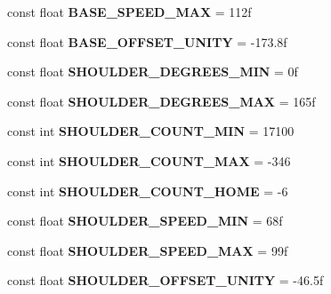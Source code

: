 \begin{DoxyCompactItemize}
const float {\bfseries B\+A\+S\+E\+\_\+\+S\+P\+E\+E\+D\+\_\+\+M\+AX} = 112f
\item 
\mbox{\label{class_scorbot_e_r_v_plus_a4389f35a8cfc607dbf6160560a141027}} 
const float {\bfseries B\+A\+S\+E\+\_\+\+O\+F\+F\+S\+E\+T\+\_\+\+U\+N\+I\+TY} = -\/173.\+8f
\item 
\mbox{\label{class_scorbot_e_r_v_plus_a36c42bc4fa0138dd783133c66fe44f06}} 
const float {\bfseries S\+H\+O\+U\+L\+D\+E\+R\+\_\+\+D\+E\+G\+R\+E\+E\+S\+\_\+\+M\+IN} = 0f
\item 
\mbox{\label{class_scorbot_e_r_v_plus_a73d4d1e3f2e76c2cab6d36f8daef78b8}} 
const float {\bfseries S\+H\+O\+U\+L\+D\+E\+R\+\_\+\+D\+E\+G\+R\+E\+E\+S\+\_\+\+M\+AX} = 165f
\item 
\mbox{\label{class_scorbot_e_r_v_plus_a4d0249ecba099244b4f4ed7efa59665d}} 
const int {\bfseries S\+H\+O\+U\+L\+D\+E\+R\+\_\+\+C\+O\+U\+N\+T\+\_\+\+M\+IN} = 17100
\item 
\mbox{\label{class_scorbot_e_r_v_plus_a5d00b0b6d76e7c424f4ca94e098595e2}} 
const int {\bfseries S\+H\+O\+U\+L\+D\+E\+R\+\_\+\+C\+O\+U\+N\+T\+\_\+\+M\+AX} = -\/346
\item 
\mbox{\label{class_scorbot_e_r_v_plus_a8b0df0bc290d9070aae27ec17cd5a1a3}} 
const int {\bfseries S\+H\+O\+U\+L\+D\+E\+R\+\_\+\+C\+O\+U\+N\+T\+\_\+\+H\+O\+ME} = -\/6
\item 
\mbox{\label{class_scorbot_e_r_v_plus_a52042f1e92bdf831a51aff1a05fbf1ca}} 
const float {\bfseries S\+H\+O\+U\+L\+D\+E\+R\+\_\+\+S\+P\+E\+E\+D\+\_\+\+M\+IN} = 68f
\item 
\mbox{\label{class_scorbot_e_r_v_plus_a8df7c024790ab4043a6c1a90529b11ff}} 
const float {\bfseries S\+H\+O\+U\+L\+D\+E\+R\+\_\+\+S\+P\+E\+E\+D\+\_\+\+M\+AX} = 99f
\item 
\mbox{\label{class_scorbot_e_r_v_plus_acafc94d7ca211a53499459cb007b8bcb}} 
const float {\bfseries S\+H\+O\+U\+L\+D\+E\+R\+\_\+\+O\+F\+F\+S\+E\+T\+\_\+\+U\+N\+I\+TY} = -\/46.\+5f

\end{DoxyCompactItemize}
